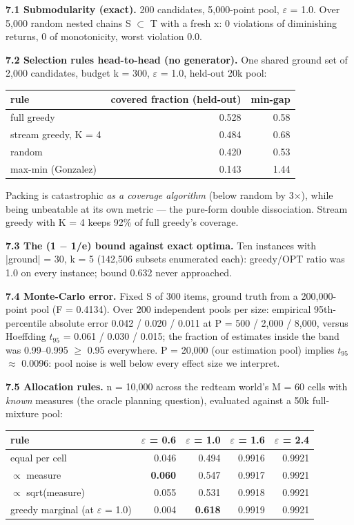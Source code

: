 \documentclass[11pt]{article}
\theoremstyle{plain}
\theoremstyle{definition}
\begin{document}
\textbf{7.1 Submodularity (exact).} 200 candidates, 5,000-point pool, $\varepsilon$ = 1.0. Over 5,000 random nested chains S $\subset$ T with a fresh x: 0 violations of diminishing returns, 0 of monotonicity, worst violation 0.0.

\textbf{7.2 Selection rules head-to-head (no generator).} One shared ground set of 2,000 candidates, budget k = 300, $\varepsilon$ = 1.0, held-out 20k pool:

\begin{table}[htbp]
\centering
\small
\begin{tabular}{lrr}
\toprule
\textbf{rule} & \textbf{covered fraction (held-out)} & \textbf{min-gap} \\
\midrule
full greedy & 0.528 & 0.58 \\
stream greedy, K = 4 & 0.484 & 0.68 \\
random & 0.420 & 0.53 \\
max-min (Gonzalez) & 0.143 & 1.44 \\
\bottomrule
\end{tabular}
\end{table}

Packing is catastrophic \emph{as a coverage algorithm} (below random by 3$\times$), while being unbeatable at its own metric --- the pure-form double dissociation. Stream greedy with K = 4 keeps 92\% of full greedy's coverage.

\textbf{7.3 The (1 $-$ 1/e) bound against exact optima.} Ten instances with |ground| = 30, k = 5 (142,506 subsets enumerated each): greedy/OPT ratio was 1.0 on every instance; bound 0.632 never approached.

\textbf{7.4 Monte-Carlo error.} Fixed S of 300 items, ground truth from a 200,000-point pool (F = 0.4134). Over 200 independent pools per size: empirical 95th-percentile absolute error 0.042 / 0.020 / 0.011 at P = 500 / 2,000 / 8,000, versus Hoeffding $t_{95}$ = 0.061 / 0.030 / 0.015; the fraction of estimates inside the band was 0.99--0.995 $\geq$ 0.95 everywhere. P = 20,000 (our estimation pool) implies $t_{95}$ $\approx$ 0.0096: pool noise is well below every effect size we interpret.

\textbf{7.5 Allocation rules.} n = 10,000 across the redteam world's M = 60 cells with \emph{known} measures (the oracle planning question), evaluated against a 50k full-mixture pool:

\begin{table}[htbp]
\centering
\small
\begin{tabular}{lrrrr}
\toprule
\textbf{rule} & \textbf{$\varepsilon$ = 0.6} & \textbf{$\varepsilon$ = 1.0} & \textbf{$\varepsilon$ = 1.6} & \textbf{$\varepsilon$ = 2.4} \\
\midrule
equal per cell & 0.046 & 0.494 & 0.9916 & 0.9921 \\
$\propto$ measure & \textbf{0.060} & 0.547 & 0.9917 & 0.9921 \\
$\propto$ sqrt(measure) & 0.055 & 0.531 & 0.9918 & 0.9921 \\
greedy marginal (at $\varepsilon$ = 1.0) & 0.004 & \textbf{0.618} & 0.9919 & 0.9921 \\
\bottomrule
\end{tabular}
\end{table}
\end{document}
